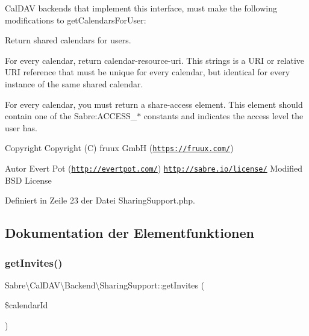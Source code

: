 Cal\+D\+AV backends that implement this interface, must make the following modifications to get\+Calendars\+For\+User\+:


\begin{DoxyEnumerate}
\item Return shared calendars for users.
\item For every calendar, return calendar-\/resource-\/uri. This strings is a U\+RI or relative U\+RI reference that must be unique for every calendar, but identical for every instance of the same shared calendar.
\item For every calendar, you must return a share-\/access element. This element should contain one of the Sabre\+:A\+C\+C\+E\+S\+S\+\_\+$\ast$ constants and indicates the access level the user has.
\end{DoxyEnumerate}

\begin{DoxyCopyright}{Copyright}
Copyright (C) fruux GmbH (\href{https://fruux.com/}{\tt https\+://fruux.\+com/}) 
\end{DoxyCopyright}
\begin{DoxyAuthor}{Autor}
Evert Pot (\href{http://evertpot.com/}{\tt http\+://evertpot.\+com/})  \href{http://sabre.io/license/}{\tt http\+://sabre.\+io/license/} Modified B\+SD License 
\end{DoxyAuthor}


Definiert in Zeile 23 der Datei Sharing\+Support.\+php.



\subsection{Dokumentation der Elementfunktionen}
\mbox{\label{interface_sabre_1_1_cal_d_a_v_1_1_backend_1_1_sharing_support_a82223ce074cb75008e420beda5df94c8}} 
\subsubsection{\texorpdfstring{get\+Invites()}{getInvites()}}
{\footnotesize\ttfamily Sabre\textbackslash{}\+Cal\+D\+A\+V\textbackslash{}\+Backend\textbackslash{}\+Sharing\+Support\+::get\+Invites (\begin{DoxyParamCaption}\item[{}]{\$calendar\+Id }\end{DoxyParamCaption})}

